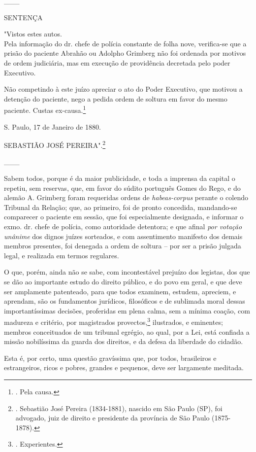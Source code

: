 \_\_\_

SENTENÇA

"Vistos estes autos.\\
Pela informação do dr. chefe de polícia constante de folha nove,
verifica-se que a prisão do paciente Abrahão ou Adolpho Grimberg não foi
ordenada por motivos de ordem judiciária, mas em execução de providência
decretada pelo poder Executivo.

Não competindo à este juízo apreciar o ato do Poder Executivo, que
motivou a detenção do paciente, nego a pedida ordem de soltura em favor
do mesmo paciente. Custas ex-causa.\footnote{. Pela causa.}

S. Paulo, 17 de Janeiro de 1880.

SEBASTIÃO JOSÉ PEREIRA".\footnote{. Sebastião José Pereira (1834-1881),
  nascido em São Paulo (SP), foi advogado, juiz de direito e presidente
  da província de São Paulo (1875-1878).}

\_\_\_

Sabem todos, porque é da maior publicidade, e toda a imprensa da capital
o repetiu, sem reservas, que, em favor do súdito português Gomes do
Rego, e do alemão A. Grimberg foram requeridas ordens de
\emph{habeas-corpus} perante o colendo Tribunal da Relação; que, ao
primeiro, foi de pronto concedida, mandando-se comparecer o paciente em
sessão, que foi especialmente designada, e informar o exmo. dr. chefe de
polícia, como autoridade detentora; e que afinal \emph{por votação
unânime} dos dignos juízes sorteados, e com assentimento manifesto dos
demais membros presentes, foi denegada a ordem de soltura -- por ser a
prisão julgada legal, e realizada em termos regulares.

O que, porém, ainda não se sabe, com incontestável prejuízo dos
legistas, dos que se dão ao importante estudo do direito público, e do
povo em geral, e que deve ser amplamente patenteado, para que todos
examinem, estudem, apreciem, e aprendam, são os fundamentos jurídicos,
filosóficos e de sublimada moral dessas importantíssimas decisões,
proferidas em plena calma, sem a mínima coação, com madureza e critério,
por magistrados provectos,\footnote{. Experientes.} ilustrados, e
eminentes; membros conceituados de um tribunal egrégio, ao qual, por a
Lei, está confiada a missão nobilíssima da guarda dos direitos, e da
defesa da liberdade do cidadão.

Esta é, por certo, uma questão gravíssima que, por todos, brasileiros e
estrangeiros, ricos e pobres, grandes e pequenos, deve ser largamente
meditada.

